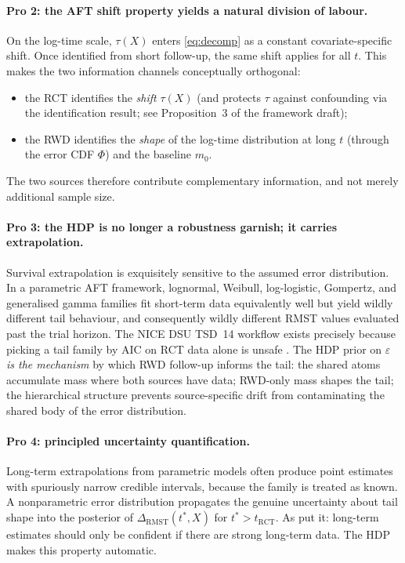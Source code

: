 \documentclass[11pt]{article}
\theoremstyle{plain}
\theoremstyle{definition}
\theoremstyle{remark}
\newcommand{\1}{\mathds{1}}
\newcommand{\X}{X}
\newcommand{\tauf}{\tau}
\newcommand{\mzero}{m_{0}}
\newcommand{\RCT}{\mathrm{RCT}}
\newcommand{\RMST}{\mathrm{RMST}}
\begin{document}
\paragraph{Pro 2: the AFT shift property yields a natural division of labour.}
On the log-time scale, $\tauf(\X)$ enters \eqref{eq:decomp} as a constant
covariate-specific shift. Once identified from short follow-up, the same
shift applies for all $t$. This makes the two information channels conceptually
orthogonal:
\begin{itemize}[leftmargin=*]
  \item the RCT identifies the \emph{shift} $\tauf(\X)$ (and protects
        $\tauf$ against confounding via the identification result;
        see Proposition~3 of the framework draft);
  \item the RWD identifies the \emph{shape} of the log-time distribution at
        long $t$ (through the error CDF $\Phi$) and the baseline $\mzero$.
\end{itemize}
The two sources therefore contribute complementary information, and not
merely additional sample size.

\paragraph{Pro 3: the HDP is no longer a robustness garnish; it carries
extrapolation.} Survival extrapolation is exquisitely sensitive to the
assumed error distribution. In a parametric AFT framework, lognormal,
Weibull, log-logistic, Gompertz, and generalised gamma families fit
short-term data equivalently well but yield wildly different tail behaviour,
and consequently wildly different RMST values evaluated past the trial
horizon. The NICE DSU TSD~14 workflow exists precisely because picking a tail
family by AIC on RCT data alone is unsafe \citep{Latimer2013, BellGorrod2019}.
The HDP prior on $\varepsilon$ \emph{is the mechanism} by which RWD follow-up
informs the tail: the shared atoms accumulate mass where both sources have
data; RWD-only mass shapes the tail; the hierarchical structure prevents
source-specific drift from contaminating the shared body of the error
distribution.

\paragraph{Pro 4: principled uncertainty quantification.} Long-term
extrapolations from parametric models often produce point estimates with
spuriously narrow credible intervals, because the family is treated as known.
A nonparametric error distribution propagates the genuine uncertainty about
tail shape into the posterior of $\Delta_{\RMST}(t^{*},\X)$ for
$t^{*} > t_{\RCT}$. As \citet{Jackson2023} put it: long-term estimates should
only be confident if there are strong long-term data. The HDP makes this
property automatic.
\end{document}

